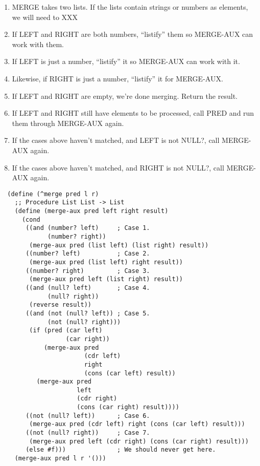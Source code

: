 \documentclass[12pt,openright,draft]{book}
\begin{document}
\begin{enumerate}

\item MERGE takes two lists.  If the lists contain strings or numbers
  as elements, we will need to XXX

\item If LEFT and RIGHT are both numbers, ``listify'' them so
  MERGE-AUX can work with them.

\item If LEFT is just a number, ``listify'' it so MERGE-AUX can work with
  it.

\item Likewise, if RIGHT is just a number, ``listify'' it for
  MERGE-AUX.

\item If LEFT and RIGHT are empty, we're done merging. Return the
  result.

\item If LEFT and RIGHT still have elements to be processed, call PRED
  and run them through MERGE-AUX again.

\item If the cases above haven't matched, and LEFT is not NULL?, call
  MERGE-AUX again.

\item If the cases above haven't matched, and RIGHT is not NULL?, call
  MERGE-AUX again.

\end{enumerate}

\begin{verbatim}
  (define (^merge pred l r)
    ;; Procedure List List -> List
    (define (merge-aux pred left right result)
      (cond
       ((and (number? left)     ; Case 1.
             (number? right))
        (merge-aux pred (list left) (list right) result))
       ((number? left)          ; Case 2.
        (merge-aux pred (list left) right result))
       ((number? right)         ; Case 3.
        (merge-aux pred left (list right) result))
       ((and (null? left)       ; Case 4.
             (null? right))
        (reverse result))
       ((and (not (null? left)) ; Case 5.
             (not (null? right)))
        (if (pred (car left)
                  (car right))
            (merge-aux pred
                       (cdr left)
                       right
                       (cons (car left) result))
          (merge-aux pred
                     left
                     (cdr right)
                     (cons (car right) result))))
       ((not (null? left))      ; Case 6.
        (merge-aux pred (cdr left) right (cons (car left) result)))
       ((not (null? right))     ; Case 7.
        (merge-aux pred left (cdr right) (cons (car right) result)))
       (else #f)))              ; We should never get here.
    (merge-aux pred l r '()))
\end{verbatim}
\end{document}
